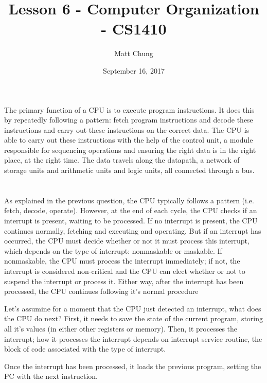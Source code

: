 \documentclass{article}
\title{Lesson 6 - Computer Organization - CS1410}
\author{Matt Chung}
\date{September 16, 2017}
\begin{document}
\maketitle

\section{}
The primary function of a CPU is to execute program instructions.  It does this by repeatedly following a pattern: fetch program instructions and decode these instructions and carry out these instructions on the correct data.  The CPU is able to carry out these instructions with the help of the control unit, a module responsible for sequencing operations and ensuring the right data is in the right place, at the right time.  The data travels along the datapath, a network of storage units and arithmetic units and logic units, all connected through a bus.

\section{}
As explained in the previous question, the CPU typically follows a pattern (i.e. fetch, decode, operate). However, at the end of each cycle, the CPU checks if an interrupt is present, waiting to be processed.  If no interrupt is present, the CPU continues normally, fetching and executing and operating. But if an interrupt has occurred, the CPU must decide whether or not it must process this interrupt, which depends on the type of interrupt: nonmaskable or maskable. If nonmaskable, the CPU must process the interrupt immediately; if not, the interrupt is considered non-critical and the CPU can elect whether or not to suspend the interrupt or process it.  Either way, after the interrupt has been processed, the CPU continues following it's normal procedure

Let's assumine for a moment that the CPU just detected an interrupt, what does the CPU do next? First, it needs to save the state of the current program, storing all it's values (in either other registers or memory). Then, it processes the interrupt; how it processes the interrupt depends on interrupt service routine, the block of code associated with the type of interrupt.

Once the interrupt has been processed, it loads the previous program, setting the PC with the next instruction.

\setcounter{section}{3}
\section{}
\end{document}
